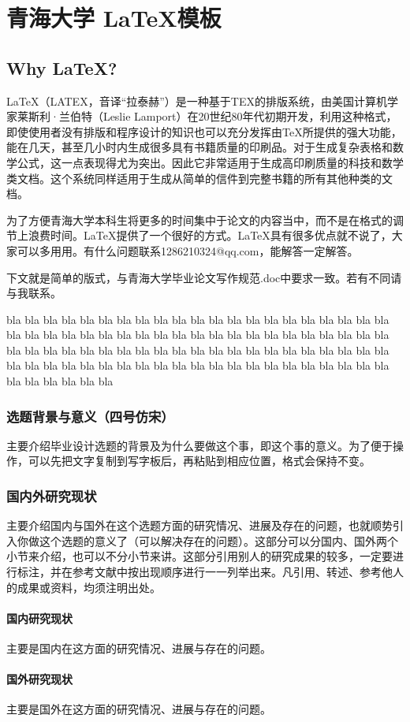 
\renewcommand{\headrulewidth}{0.4pt} 
\chapter{青海大学 \LaTeX 模板}
\section{Why \LaTeX ? }
\LaTeX（LATEX，音译“拉泰赫”）是一种基于TEX的排版系统，由美国计算机学家莱斯利·兰伯特（Leslie Lamport）在20世纪80年代初期开发，利用这种格式，即使使用者没有排版和程序设计的知识也可以充分发挥由\TeX{}所提供的强大功能，能在几天，甚至几小时内生成很多具有书籍质量的印刷品。对于生成复杂表格和数学公式，这一点表现得尤为突出。因此它非常适用于生成高印刷质量的科技和数学类文档。这个系统同样适用于生成从简单的信件到完整书籍的所有其他种类的文档。

为了方便青海大学本科生将更多的时间集中于论文的内容当中，而不是在格式的调节上浪费时间。\LaTeX 提供了一个很好的方式。\LaTeX 具有很多优点就不说了，大家可以多用用。有什么问题联系1286210324@qq.com，能解答一定解答。
\par 下文就是简单的版式，与青海大学毕业论文写作规范.doc中要求一致。若有不同请与我联系。

bla bla bla bla bla bla bla bla bla bla bla bla bla bla bla bla bla bla bla bla bla bla bla bla bla bla bla bla bla bla bla bla bla bla bla bla bla bla bla bla bla bla bla bla bla bla bla bla bla bla bla bla bla bla bla bla bla bla bla bla bla bla bla bla bla bla bla bla bla bla bla bla bla bla bla bla bla bla bla bla bla bla bla bla bla bla bla bla bla bla

\subsection{选题背景与意义（四号仿宋）}
主要介绍毕业设计选题的背景及为什么要做这个事，即这个事的意义。为了便于操作，可以先把文字复制到写字板后，再粘贴到相应位置，格式会保持不变。
\subsection{国内外研究现状}
主要介绍国内与国外在这个选题方面的研究情况、进展及存在的问题，也就顺势引入你做这个选题的意义了（可以解决存在的问题）。这部分可以分国内、国外两个小节来介绍，也可以不分小节来讲。这部分引用别人的研究成果的较多，一定要进行标注，并在参考文献中按出现顺序进行一一列举出来。凡引用、转述、参考他人的成果或资料，均须注明出处。
\subsubsection{国内研究现状}
主要是国内在这方面的研究情况、进展与存在的问题。
\subsubsection{国外研究现状}
主要是国外在这方面的研究情况、进展与存在的问题。

